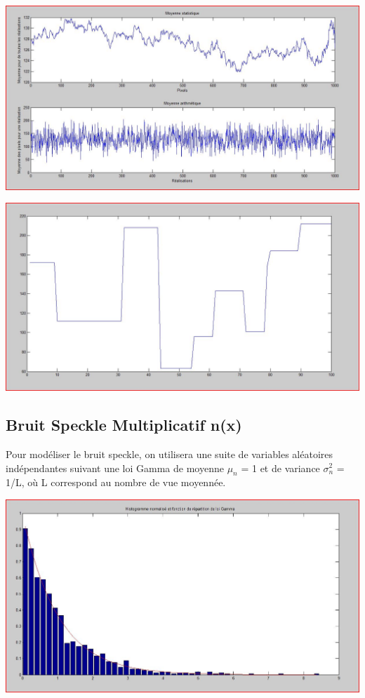 \documentclass[a4paper,11pt]{article}
\newcommand{\FSource}[1]{%
  
  }
\begin{document}
\vspace{0.5cm}

\FSource{matlab/genligne.m}

\vspace{0.5cm}

\includegraphics[width=15cm]{capture/ergo.JPG}

\includegraphics[width=15cm]{capture/Capturer.JPG}

\subsection{Bruit Speckle Multiplicatif n(x)}

Pour modéliser le bruit speckle, on utilisera une suite de variables aléatoires indépendantes suivant une loi Gamma de moyenne $\mu_n$ = 1 et de variance $\sigma_n^2$ = 1/L, où L correspond au nombre de vue moyennée.

\vspace{0.5cm}

\FSource{matlab/2.m}

\vspace{0.5cm}

\includegraphics[width=15cm]{capture/bruit.JPG}
\end{document}
